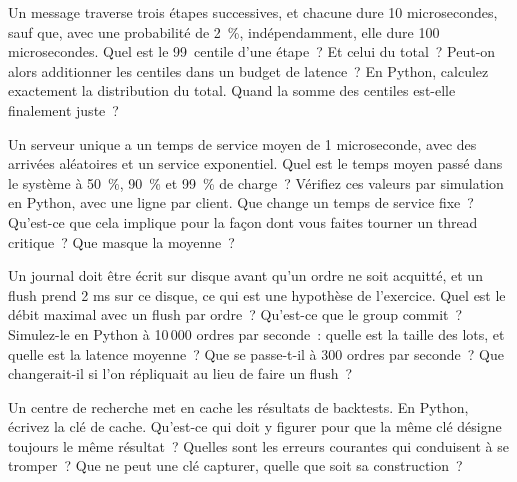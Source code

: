 \begin{question}\label{iq:iv3:system-design:24}
Un message traverse trois étapes successives, et chacune dure 10 microsecondes, sauf que, avec une probabilité de 2~\%, indépendamment, elle dure 100 microsecondes. Quel est le 99~centile d'une étape~? Et celui du total~? Peut-on alors additionner les centiles dans un budget de latence~? En Python, calculez exactement la distribution du total. Quand la somme des centiles est-elle finalement juste~?
\end{question}

\begin{question}\label{iq:iv3:system-design:25}
Un serveur unique a un temps de service moyen de 1 microseconde, avec des arrivées aléatoires et un service exponentiel. Quel est le temps moyen passé dans le système à 50~\%, 90~\% et 99~\% de charge~? Vérifiez ces valeurs par simulation en Python, avec une ligne par client. Que change un temps de service fixe~? Qu'est-ce que cela implique pour la façon dont vous faites tourner un thread critique~? Que masque la moyenne~?
\end{question}

\begin{question}\label{iq:iv3:system-design:26}
Un journal doit être écrit sur disque avant qu'un ordre ne soit acquitté, et un flush prend 2 ms sur ce disque, ce qui est une hypothèse de l'exercice. Quel est le débit maximal avec un flush par ordre~? Qu'est-ce que le group commit~? Simulez-le en Python à 10\,000 ordres par seconde~: quelle est la taille des lots, et quelle est la latence moyenne~? Que se passe-t-il à 300 ordres par seconde~? Que changerait-il si l'on répliquait au lieu de faire un flush~?
\end{question}

\begin{question}\label{iq:iv3:system-design:27}
Un centre de recherche met en cache les résultats de backtests. En Python, écrivez la clé de cache. Qu'est-ce qui doit y figurer pour que la même clé désigne toujours le même résultat~? Quelles sont les erreurs courantes qui conduisent à se tromper~? Que ne peut une clé capturer, quelle que soit sa construction~?
\end{question}

